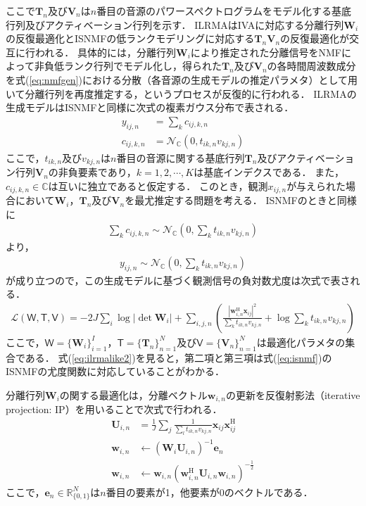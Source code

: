 ここで$\bm{T}_n$及び$\bm{V}_n$は$n$番目の音源のパワースペクトログラムをモデル化する基底行列及びアクティベーション行列を示す．
ILRMAはIVAに対応する分離行列$\bm{W}_i$の反復最適化とISNMFの低ランクモデリングに対応する$\bm{T}_n\bm{V}_n$の反復最適化が交互に行われる．
具体的には，分離行列$\bm{W}_i$により推定された分離信号をNMFによって非負低ランク行列でモデル化し，得られた$\bm{T}_n$及び$\bm{V}_n$の各時間周波数成分を式(\ref{eq:nmfgen})における分散（各音源の生成モデルの推定パラメタ）として用いて分離行列を再度推定する，というプロセスが反復的に行われる．
ILRMAの生成モデルはISNMFと同様に次式の複素ガウス分布で表される．
\begin{align}
    y_{ij,n} &= \sum_k c_{ij,k,n} \\
    c_{ij,k,n} &= \mathcal{N}_{\mathbb{C}}(0, t_{ik,n} v_{kj,n}) \label{eq:ilrma_gen}
\end{align}
ここで，$t_{ik,n}$及び$v_{kj,n}$は$n$番目の音源に関する基底行列$\bm{T}_n$及びアクティベーション行列$\bm{V}_n$の非負要素であり，$k = 1, 2, \cdots, K$は基底インデクスである．
また，$c_{ij,k,n} \in \mathbb{C}$は互いに独立であると仮定する．
このとき，観測$x_{ij,n}$が与えられた場合において$\bm{W}_i$，$\bm{T}_n$及び$\bm{V}_n$を最尤推定する問題を考える．
ISNMFのときと同様に
\begin{align}
    \sum_k c_{ij,k,n} \sim \mathcal{N}_{\mathbb{C}}\left( 0, \sum_k t_{ik,n} v_{kj,n} \right)
\end{align}
より，
\begin{align}
    y_{ij,n} \sim \mathcal{N}_{\mathbb{C}}\left( 0, \sum_k t_{ik,n} v_{kj,n} \right) 
\end{align}
が成り立つので，この生成モデルに基づく観測信号の負対数尤度は次式で表される．
\begin{align}
    \mathcal{L}(\mathsf{W, T, V}) = -2J \sum_i \log | \det \bm{W}_i | + \sum_{i,j,n} \left( \frac{|\bm{w}_{i,n}^{\mathrm{H}}\bm{x}_{ij}|^2}{\sum_k t_{ik,n}v_{kj,n}} + \log \sum_k t_{ik,n}v_{kj,n} \right)
    \label{eq:ilrmalike2}
\end{align}
ここで，$\mathsf{W}=\{ \bm{W}_i \}_{i=1}^I$，$\mathsf{T}=\{ \bm{T}_n \}_{n=1}^N$及び$\mathsf{V}=\{ \bm{V}_n \}_{n=1}^N$は最適化パラメタの集合である．
式(\ref{eq:ilrmalike2})を見ると，第二項と第三項は式(\ref{eq:isnmf})のISNMFの尤度関数に対応していることがわかる．

分離行列$\bm{W}_i$の関する最適化は，分離ベクトル$\bm{w}_{i,n}$の更新を反復射影法（iterative projection: IP）\cite{auxIVA}を用いることで次式で行われる．
\begin{align}
\bm{U}_{i,n} &= \frac{1}{J} \sum_j \frac{1}{\sum_{l}t_{ik,n}v_{kj,n}} \bm{x}_{ij} \bm{x}_{ij}^{\mathrm{H}} \label{eq:ip1} \\
\bm{w}_{i,n} &\leftarrow (\bm{W}_i \bm{U}_{i,n})^{-1} \bm{e}_n \label{eq:ip2} \\
\bm{w}_{i,n} &\leftarrow \bm{w}_{i,n} ( \bm{w}_{i,n}^{\mathrm{H}} \bm{U}_{i,n} \bm{w}_{i,n} )^{-\frac{1}{2}} \label{eq:ip3}
\end{align}
ここで，$\bm{e}_n \in \mathbb{R}_{\{0, 1\}}^{N}$は$n$番目の要素が1，他要素が0のベクトルである．

